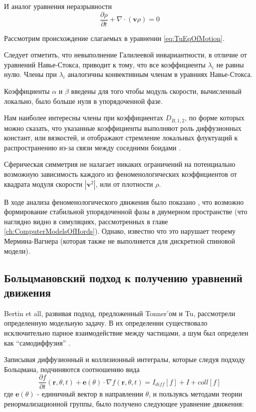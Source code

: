 		И аналог уравнения неразрывности
		\begin{equation}
		\label{eq:TuEqOfContinuoty}
			\frac{\partial \rho}{\partial t} + \nabla \cdot (\boldsymbol{v} \rho) = 0
		\end{equation}

		Рассмотрим происхождение слагаемых в уравнении \ref{eq:TuEqOfMotion}.

		Следует отметить, что невыполнение Галилеевой инвариантности, в отличие от уравнений Навье-Стокса, приводит к тому, что все коэффициенты $\lambda_i$ не равны нулю. Члены при $\lambda_i$ аналогичны конвективным членам в уравниях Навье-Стокса.

		Коэффициенты $\alpha$ и $\beta$ введены для того чтобы модуль скорости, вычисленный локально, было больше нуля в упорядоченной фазе.

		Нам наиболее интересны члены при коэффициентах $D_{B,1,2}$, по форме которых можно сказать, что указанные коэффициенты выполняют роль диффузионных констант, или вязкостей, и отображают стремление локальных флуктуаций к распространению из-за связи между соседними боидами \cite{tu2000}.

		Сферическая симметрия не налагает никаких ограничений на потенциально возможную зависимость каждого из феноменологических коэффициентов от квадрата модуля скорости $|\boldsymbol{v}^2|$, или от плотности $\rho$.

		В ходе анализа феноменологического движения было показано \cite{tu2000}, что возможно формирование стабильной упорядоченной фазы в двумерном пространстве (что наглядно видно в симуляциях, рассмотренных в главе \ref{ch:ComputerModelsOfHords}). Однако, известно что это нарушает теорему Мермина-Вагнера (которая также не выполняется для дискретной спиновой модели).

	\subsection{Больцмановский подход к получению уравнений движения} %
	\label{sub:BetrinBoltzmanApproach}
		Bertin et all, развивая подход, предложенный Tonner'ом и Tu, рассмотрели определенную модельную задачу. В их определении существовало исключительно парное взаимодействие между частицами, а шум был определен как ``самодиффузия'' \cite{bertin2006}.

		Записывая диффузионный и коллизионный интегралы, которые следуя подходу Больцмана, подчиняются соотношению вида
		\begin{equation}
			\frac{\partial f}{\partial t}(\boldsymbol{r},\theta,t) + \boldsymbol{e}(\theta) \cdot \nabla f(\boldsymbol{r}, \theta, t) = I_{diff}[f]+I+{coll}[f]
		\end{equation}
		где $\boldsymbol{e}(\theta)$ - единичный вектор в направлении $\theta$, и пользуясь методами теории ренормализационной группы, было получено следующее уравнение движения:

